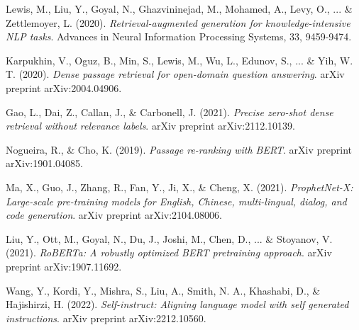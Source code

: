 \documentclass[12pt,a4paper]{article}
\begin{document}
\newpage
\tableofcontents
\newpage













\begin{thebibliography}{99}

Lewis, M., Liu, Y., Goyal, N., Ghazvininejad, M., Mohamed, A., Levy, O., ... \& Zettlemoyer, L. (2020).
\textit{Retrieval-augmented generation for knowledge-intensive NLP tasks}.
Advances in Neural Information Processing Systems, 33, 9459-9474.

Karpukhin, V., Oguz, B., Min, S., Lewis, M., Wu, L., Edunov, S., ... \& Yih, W. T. (2020).
\textit{Dense passage retrieval for open-domain question answering}.
arXiv preprint arXiv:2004.04906.

Gao, L., Dai, Z., Callan, J., \& Carbonell, J. (2021).
\textit{Precise zero-shot dense retrieval without relevance labels}.
arXiv preprint arXiv:2112.10139.

Nogueira, R., \& Cho, K. (2019).
\textit{Passage re-ranking with BERT}.
arXiv preprint arXiv:1901.04085.

Ma, X., Guo, J., Zhang, R., Fan, Y., Ji, X., \& Cheng, X. (2021).
\textit{ProphetNet-X: Large-scale pre-training models for English, Chinese, multi-lingual, dialog, and code generation}.
arXiv preprint arXiv:2104.08006.

Liu, Y., Ott, M., Goyal, N., Du, J., Joshi, M., Chen, D., ... \& Stoyanov, V. (2021).
\textit{RoBERTa: A robustly optimized BERT pretraining approach}.
arXiv preprint arXiv:1907.11692.

Wang, Y., Kordi, Y., Mishra, S., Liu, A., Smith, N. A., Khashabi, D., \& Hajishirzi, H. (2022).
\textit{Self-instruct: Aligning language model with self generated instructions}.
arXiv preprint arXiv:2212.10560.


\end{thebibliography}
\end{document}
